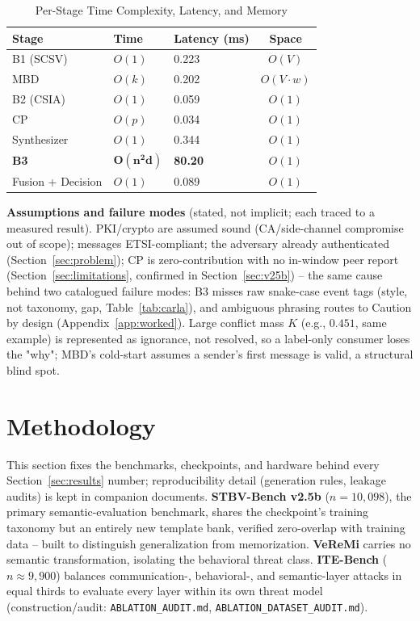 \documentclass[conference]{IEEEtran}
\begin{document}
\begin{table}[t]
\centering
\caption{Per-Stage Time Complexity, Latency, and Memory}
\label{tab:complexity}
\footnotesize
\begin{tabular}{@{}lllc@{}}
\toprule
Stage & Time & Latency (ms) & Space \\
\midrule
B1 (SCSV) & $O(1)$ & 0.223 & $O(V)$ \\
MBD & $O(k)$ & 0.202 & $O(V{\cdot}w)$ \\
B2 (CSIA) & $O(1)$ & 0.059 & $O(1)$ \\
CP & $O(p)$ & 0.034 & $O(1)$ \\
Synthesizer & $O(1)$ & 0.344 & $O(1)$ \\
\textbf{B3} & $\mathbf{O(n^2 d)}$ & \textbf{80.20} & $O(1)$ \\
Fusion + Decision & $O(1)$ & 0.089 & $O(1)$ \\
\bottomrule
\end{tabular}
\end{table}

\textbf{Assumptions and failure modes} (stated, not implicit; each traced to a measured result). PKI/crypto are assumed sound (CA/side-channel compromise out of scope); messages ETSI-compliant; the adversary already authenticated (Section~\ref{sec:problem}); CP is zero-contribution with no in-window peer report (Section~\ref{sec:limitations}, confirmed in Section~\ref{sec:v25b}) -- the same cause behind two catalogued failure modes: B3 misses raw snake-case event tags (style, not taxonomy, gap, Table~\ref{tab:carla}), and ambiguous phrasing routes to Caution by design (Appendix~\ref{app:worked}). Large conflict mass $K$ (e.g., $0.451$, same example) is represented as ignorance, not resolved, so a label-only consumer loses the "why"; MBD's cold-start assumes a sender's first message is valid, a structural blind spot.

\section{Methodology}
\label{sec:methodology}
This section fixes the benchmarks, checkpoints, and hardware behind every Section~\ref{sec:results} number; reproducibility detail (generation rules, leakage audits) is kept in companion documents. \textbf{STBV-Bench v2.5b} ($n{=}10{,}098$), the primary semantic-evaluation benchmark, shares the checkpoint's training taxonomy but an entirely new template bank, verified zero-overlap with training data -- built to distinguish generalization from memorization. \textbf{VeReMi} carries no semantic transformation, isolating the behavioral threat class. \textbf{ITE-Bench} ($n{\approx}9{,}900$) balances communication-, behavioral-, and semantic-layer attacks in equal thirds to evaluate every layer within its own threat model (construction/audit: \texttt{ABLATION\_AUDIT.md}, \texttt{ABLATION\_DATASET\_AUDIT.md}).
\end{document}
